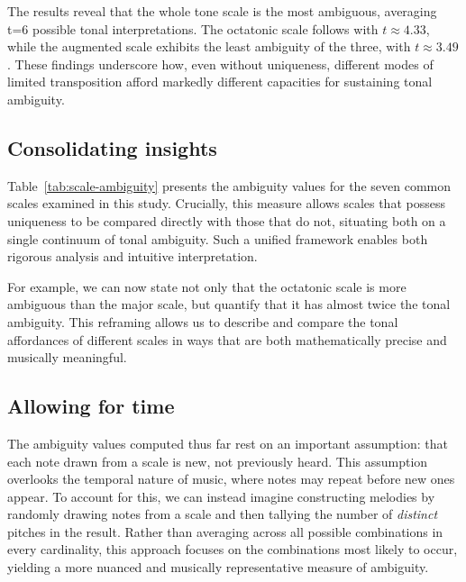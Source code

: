 \documentclass[10pt,twocolumn]{article}
\numberwithin{equation}{section} %
\begin{document}
    The results reveal that the whole tone scale is the most ambiguous, averaging t=6 possible tonal interpretations.
    The octatonic scale follows with $t \approx 4.33$, while the augmented scale exhibits the least ambiguity of the three, with $t \approx 3.49$.
    These findings underscore how, even without uniqueness, different modes of limited transposition afford markedly different capacities for sustaining tonal ambiguity.

    

    \subsection{Consolidating insights}

    Table~\ref{tab:scale-ambiguity} presents the ambiguity values for the seven common scales examined in this study.
    Crucially, this measure allows scales that possess uniqueness to be compared directly with those that do not, situating both on a single continuum of tonal ambiguity.
    Such a unified framework enables both rigorous analysis and intuitive interpretation.

    For example, we can now state not only that the octatonic scale is more ambiguous than the major scale, but quantify that it has almost twice the tonal ambiguity.
    This reframing allows us to describe and compare the tonal affordances of different
    scales in ways that are both mathematically precise and musically meaningful.

    

    \subsection{Allowing for time}

    The ambiguity values computed thus far rest on an important assumption: that each note drawn from a scale is new, not previously heard.
    This assumption overlooks the temporal nature of music, where notes may repeat before new ones appear.
    To account for this, we can instead imagine constructing melodies by randomly drawing notes from a scale and then tallying the number of \textit{distinct} pitches in the result.
    Rather than averaging across all possible combinations in every cardinality, this approach focuses on the combinations most likely to occur, yielding a more nuanced and musically representative measure of ambiguity.
\end{document}
